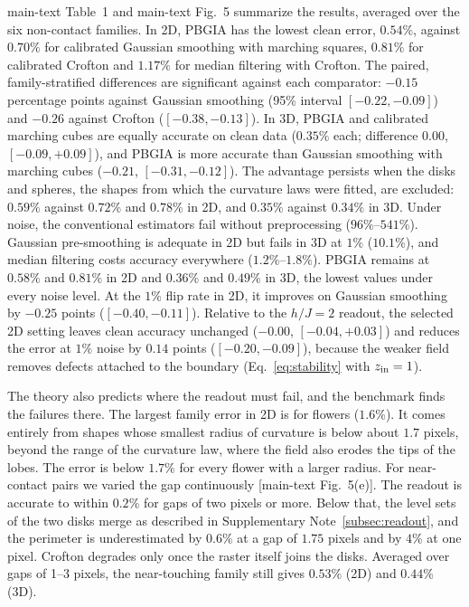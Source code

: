 \documentclass[11pt,a4paper]{article}
\begin{document}
main-text Table~1 and main-text Fig.~5 summarize the results, averaged over the six non-contact families. In 2D, PBGIA has the lowest clean error, $0.54\%$, against $0.70\%$ for calibrated Gaussian smoothing with marching squares, $0.81\%$ for calibrated Crofton and $1.17\%$ for median filtering with Crofton. The paired, family-stratified differences are significant against each comparator: $-0.15$ percentage points against Gaussian smoothing (95\% interval $[-0.22,-0.09]$) and $-0.26$ against Crofton ($[-0.38,-0.13]$). In 3D, PBGIA and calibrated marching cubes are equally accurate on clean data ($0.35\%$ each; difference $0.00$, $[-0.09,+0.09]$), and PBGIA is more accurate than Gaussian smoothing with marching cubes ($-0.21$, $[-0.31,-0.12]$). The advantage persists when the disks and spheres, the shapes from which the curvature laws were fitted, are excluded: $0.59\%$ against $0.72\%$ and $0.78\%$ in 2D, and $0.35\%$ against $0.34\%$ in 3D. Under noise, the conventional estimators fail without preprocessing ($96\%$--$541\%$). Gaussian pre-smoothing is adequate in 2D but fails in 3D at $1\%$ ($10.1\%$), and median filtering costs accuracy everywhere ($1.2\%$--$1.8\%$). PBGIA remains at $0.58\%$ and $0.81\%$ in 2D and $0.36\%$ and $0.49\%$ in 3D, the lowest values under every noise level. At the $1\%$ flip rate in 2D, it improves on Gaussian smoothing by $-0.25$ points ($[-0.40,-0.11]$). Relative to the $h/J=2$ readout, the selected 2D setting leaves clean accuracy unchanged ($-0.00$, $[-0.04,+0.03]$) and reduces the error at $1\%$ noise by $0.14$ points ($[-0.20,-0.09]$), because the weaker field removes defects attached to the boundary (Eq.~\eqref{eq:stability} with $z_{\rm in}=1$).

The theory also predicts where the readout must fail, and the benchmark finds the failures there. The largest family error in 2D is for flowers ($1.6\%$). It comes entirely from shapes whose smallest radius of curvature is below about $1.7$ pixels, beyond the range of the curvature law, where the field also erodes the tips of the lobes. The error is below $1.7\%$ for every flower with a larger radius. For near-contact pairs we varied the gap continuously [main-text Fig.~5(e)]. The readout is accurate to within $0.2\%$ for gaps of two pixels or more. Below that, the level sets of the two disks merge as described in Supplementary Note~\ref{subsec:readout}, and the perimeter is underestimated by $0.6\%$ at a gap of $1.75$ pixels and by $4\%$ at one pixel. Crofton degrades only once the raster itself joins the disks. Averaged over gaps of 1--3 pixels, the near-touching family still gives $0.53\%$ (2D) and $0.44\%$ (3D).
\end{document}
